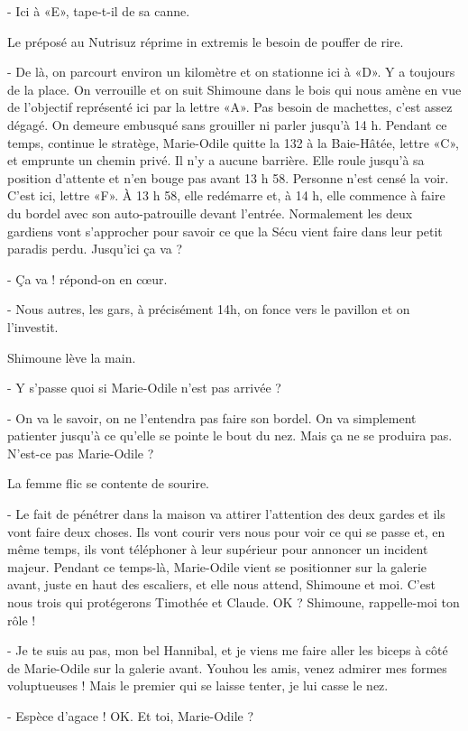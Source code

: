 - Ici à «E», tape-t-il de sa canne.

Le préposé au Nutrisuz réprime in extremis le besoin de pouffer de rire.

- De là, on parcourt environ un kilomètre et on stationne ici à «D». Y a toujours de la place. On verrouille et on suit Shimoune dans le bois qui nous amène en vue de l’objectif représenté ici par la lettre «A». Pas besoin de machettes, c’est assez dégagé. On demeure embusqué sans grouiller ni parler jusqu’à 14 h. Pendant ce temps, continue le stratège, Marie-Odile quitte la 132 à la Baie-Hâtée, lettre «C», et emprunte un chemin privé. Il n’y a aucune barrière. Elle roule jusqu’à sa position d’attente et n’en bouge pas avant 13 h 58. Personne n’est censé la voir. C’est ici, lettre «F». À 13 h 58, elle redémarre et, à 14 h, elle commence à faire du bordel avec son auto-patrouille devant l’entrée. Normalement les deux gardiens vont s’approcher pour savoir ce que la Sécu vient faire dans leur petit paradis perdu. Jusqu’ici ça va ?

- Ça va ! répond-on en cœur.

- Nous autres, les gars, à précisément 14h, on fonce vers le pavillon et on l’investit.

Shimoune lève la main.

- Y s’passe quoi si Marie-Odile n’est pas arrivée ?

- On va le savoir, on ne l’entendra pas faire son bordel. On va simplement patienter jusqu’à ce qu’elle se pointe le bout du nez. Mais ça ne se produira pas. N’est-ce pas Marie-Odile ?

La femme flic se contente de sourire.

- Le fait de pénétrer dans la maison va attirer l’attention des deux gardes et ils vont faire deux choses. Ils vont courir vers nous pour voir ce qui se passe et, en même temps, ils vont téléphoner à leur supérieur pour annoncer un incident majeur. Pendant ce temps-là, Marie-Odile vient se positionner sur la galerie avant, juste en haut des escaliers, et elle nous attend, Shimoune et moi. C’est nous trois qui protégerons Timothée et Claude. OK ? Shimoune, rappelle-moi ton rôle !

- Je te suis au pas, mon bel Hannibal, et je viens me faire aller les biceps à côté de Marie-Odile sur la galerie avant. Youhou les amis, venez admirer mes formes voluptueuses ! Mais le premier qui se laisse tenter, je lui casse le nez.

- Espèce d’agace ! OK. Et toi, Marie-Odile ?

